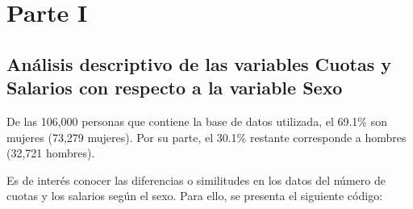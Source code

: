 \documentclass[
]{article}
\begin{document}
\hypertarget{parte-i}{%
\section{Parte I}\label{parte-i}}

\hypertarget{anuxe1lisis-descriptivo-de-las-variables-cuotas-y-salarios-con-respecto-a-la-variable-sexo}{%
\subsection{Análisis descriptivo de las variables Cuotas y Salarios con
respecto a la variable
Sexo}\label{anuxe1lisis-descriptivo-de-las-variables-cuotas-y-salarios-con-respecto-a-la-variable-sexo}}

De las 106,000 personas que contiene la base de datos utilizada, el
69.1\% son mujeres (73,279 mujeres). Por su parte, el 30.1\% restante
corresponde a hombres (32,721 hombres).

Es de interés conocer las diferencias o similitudes en los datos del
número de cuotas y los salarios según el sexo. Para ello, se presenta el
siguiente código:
\end{document}
